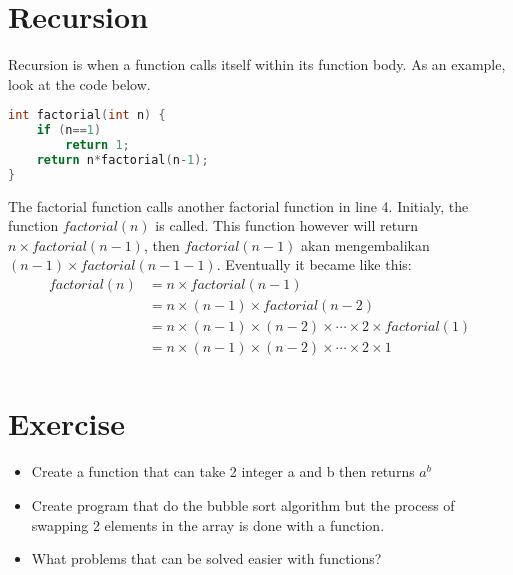 \section{Recursion}
Recursion is when a function calls itself within its function body.
As an example, look at the code below.
\begin{lstlisting}[language=c,caption = Factorial with recursion,label=lst:recursionexample01]
int factorial(int n) {
    if (n==1)
        return 1;
    return n*factorial(n-1);
}
\end{lstlisting}
The factorial function calls another factorial function in line 4.
Initialy, the function $factorial(n)$ is called. This function however will return 
$n\times factorial(n-1)$, then $factorial(n-1)$ akan mengembalikan $(n-1)\times factorial(n-1-1)$.
Eventually it became like this:
\begin{equation*}
    \begin{split}
        factorial(n)& = n \times factorial(n-1)\\
        & = n \times (n-1) \times factorial(n-2)\\
        & = n \times (n-1) \times (n-2) \times \cdots \times 2 \times factorial(1)\\
        & = n \times (n-1) \times (n-2) \times \cdots \times 2 \times 1\\
    \end{split}
\end{equation*}

\section{Exercise}
\begin{itemize}
    \item Create a function that can take 2 integer a and b then returns $a^b$
    \item Create program that do the bubble sort algorithm but the process of swapping 2 elements in the array is done with a function.
    \item What problems that can be solved easier with functions?
\end{itemize}
